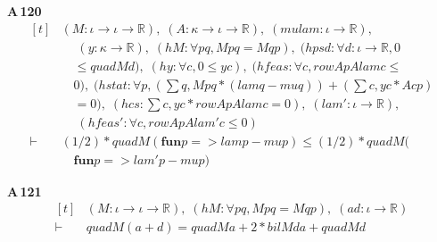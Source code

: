 \noindent\textbf{A\,120}\quad{}
{\footnotesize\[ \begin{aligned}[t]
&(\mathit{M} : \iota \to \iota \to \mathbb{R} ),\; (\mathit{A} : \kappa \to \iota \to \mathbb{R} ),\; (\mathit{mu} \mathit{lam} : \iota \to \mathbb{R} ),\\
&\quad \; (\mathit{y} : \kappa \to \mathbb{R} ),\; (\mathit{hM} : \forall \mathit{p} \mathit{q}, \mathit{M} \mathit{p} \mathit{q} = \mathit{M} \mathit{q} \mathit{p}),\; (\mathit{hpsd} : \forall \mathit{d} : \iota \to \mathbb{R} , 0\\
&\quad \leq \mathit{quad} \mathit{M} \mathit{d}),\; (\mathit{hy} : \forall \mathit{c}, 0 \leq \mathit{y} \mathit{c}),\; (\mathit{hfeas} : \forall \mathit{c}, \mathit{rowAp} \mathit{A} \mathit{lam} \mathit{c} \leq\\
&\quad 0),\; (\mathit{hstat} : \forall \mathit{p}, (\textstyle\sum \mathit{q}, \mathit{M} \mathit{p} \mathit{q} * (\mathit{lam} \mathit{q} - \mathit{mu} \mathit{q})) + (\textstyle\sum \mathit{c}, \mathit{y} \mathit{c} * \mathit{A} \mathit{c} \mathit{p})\\
&\quad = 0),\; (\mathit{hcs} : \textstyle\sum \mathit{c}, \mathit{y} \mathit{c} * \mathit{rowAp} \mathit{A} \mathit{lam} \mathit{c} = 0),\; (\mathit{lam'} : \iota \to \mathbb{R} ),\\
&\quad \; (\mathit{hfeas'} : \forall \mathit{c}, \mathit{rowAp} \mathit{A} \mathit{lam'} \mathit{c} \leq 0)\\
\vdash\;&(1/2) * \mathit{quad} \mathit{M} (\mathbf{fun} \mathit{p} => \mathit{lam} \mathit{p} - \mathit{mu} \mathit{p}) \leq (1/2) * \mathit{quad} \mathit{M} (\\
&\quad \mathbf{fun} \mathit{p} => \mathit{lam'} \mathit{p} - \mathit{mu} \mathit{p})
\end{aligned} \]}

\noindent\textbf{A\,121}\quad{}
{\footnotesize\[ \begin{aligned}[t]
&(\mathit{M} : \iota \to \iota \to \mathbb{R} ),\; (\mathit{hM} : \forall \mathit{p} \mathit{q}, \mathit{M} \mathit{p} \mathit{q} = \mathit{M} \mathit{q} \mathit{p}),\; (\mathit{a} \mathit{d} : \iota \to \mathbb{R} )\\
\vdash\;&\mathit{quad} \mathit{M} (\mathit{a} + \mathit{d}) = \mathit{quad} \mathit{M} \mathit{a} + 2 * \mathit{bil} \mathit{M} \mathit{d} \mathit{a} + \mathit{quad} \mathit{M} \mathit{d}
\end{aligned} \]}

